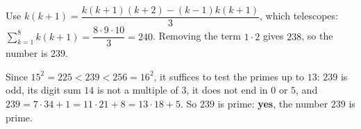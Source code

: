 Use $k(k+1)=\dfrac{k(k+1)(k+2)-(k-1)k(k+1)}{3}$, which telescopes: $\sum_{k=1}^{8}k(k+1)=\dfrac{8\cdot9\cdot10}{3}=240$. Removing the term $1\cdot2$ gives $238$, so the number is $239$.

Since $15^2=225<239<256=16^2$, it suffices to test the primes up to $13$: $239$ is odd, its digit sum $14$ is not a multiple of $3$, it does not end in $0$ or $5$, and $239=7\cdot34+1=11\cdot21+8=13\cdot18+5$. So $239$ is prime: \textbf{yes}, the number $\boxed{239}$ is prime.
